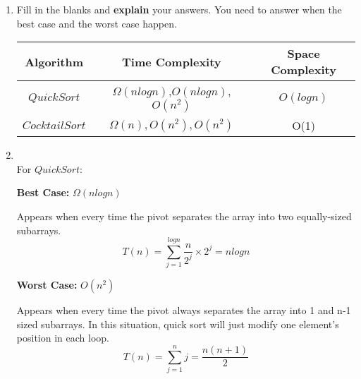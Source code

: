 \documentclass[12pt,a4paper]{article}
\makeatletter
\newtheorem*{solution}{Solution}
\theoremstyle{definition}
\renewenvironment{solution}[1][Solution] {\par\pushQED{\qed}\normalfont\topsep6\p@\@plus6\p@\relax\trivlist\item[\hskip\labelsep\bfseries#1\@addpunct{.}]\ignorespaces}{\popQED\endtrivlist\@endpefalse} \makeatother
\makeatother
\begin{document}
\begin{enumerate}
\begin{minipage}[t]{0.45\textwidth}
\begin{algorithm}[H]
		$i\leftarrow i+1$\;
	}
\end{algorithm}
\end{minipage}

\begin{enumerate}
	 
\item Fill in the blanks and \textbf{explain} your answers. You need to answer when the best case and the worst case happen. 
\begin{table}[!h]

\label{Tab-compare}
	\centering
	\begin{threeparttable}
	\begin{tabular}{c|c| c }
		\toprule[2pt]
		\textbf{Algorithm} & \textbf{Time Complexity}\tnote{1} & \textbf{Space Complexity} \\
		\hline
		\hline
		$QuickSort$ & $\Omega(nlogn)$,$O(nlogn)$,$O(n^2)$  &  $O(logn)$ \\

		$CocktailSort$ & $\Omega(n),O(n^2) ,O(n^2)$ & O(1)  \\ 
		\bottomrule[2pt]


	\end{tabular}
	\end{threeparttable}
\end{table}


\begin{solution}
~\\
For $QuickSort$:

\textbf{Best Case: }$\Omega(nlogn)$

Appears when every time the pivot separates the array into two equally-sized subarrays. 
$$
\displaystyle T(n) = \sum_{j=1}^{logn}\frac{n}{2^j} \times 2^j = nlogn
$$

\textbf{Worst Case: }$O(n^2)$

Appears when every time the pivot always separates the array into 1 and n-1 sized subarrays. In this situation, quick sort will just modify one element's position in each loop.
$$
\displaystyle T(n)=\sum_{j=1}^{n}j=\frac{n(n+1)}{2}
$$




\end{solution}
\end{enumerate}
\end{enumerate}
\end{document}
